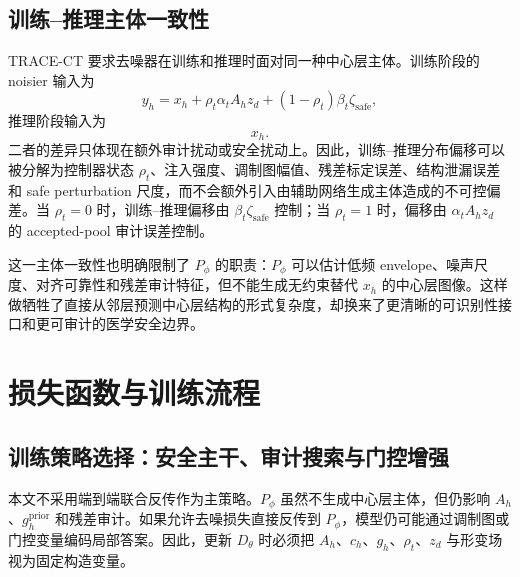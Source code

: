 \documentclass[11pt,a4paper,UTF8,fontset=fandol]{ctexart}
\theoremstyle{definition}
\begin{document}
\subsection{训练--推理主体一致性}

TRACE-CT 要求去噪器在训练和推理时面对同一种中心层主体。训练阶段的 noisier 输入为
\begin{equation}
    y_h=x_h+\rho_t\alpha_tA_hz_d+(1-\rho_t)\beta_t\zeta_{\mathrm{safe}},
\end{equation}
推理阶段输入为
\begin{equation}
    x_h.
\end{equation}
二者的差异只体现在额外审计扰动或安全扰动上。因此，训练--推理分布偏移可以被分解为控制器状态 $\rho_t$、注入强度、调制图幅值、残差标定误差、结构泄漏误差和 safe perturbation 尺度，而不会额外引入由辅助网络生成主体造成的不可控偏差。当 $\rho_t=0$ 时，训练--推理偏移由 $\beta_t\zeta_{\mathrm{safe}}$ 控制；当 $\rho_t=1$ 时，偏移由 $\alpha_tA_hz_d$ 的 accepted-pool 审计误差控制。

这一主体一致性也明确限制了 $P_\phi$ 的职责：$P_\phi$ 可以估计低频 envelope、噪声尺度、对齐可靠性和残差审计特征，但不能生成无约束替代 $x_h$ 的中心层图像。这样做牺牲了直接从邻层预测中心层结构的形式复杂度，却换来了更清晰的可识别性接口和更可审计的医学安全边界。


\section{损失函数与训练流程}


\subsection{训练策略选择：安全主干、审计搜索与门控增强}

本文不采用端到端联合反传作为主策略。$P_\phi$ 虽然不生成中心层主体，但仍影响 $A_h$、$g_h^{\mathrm{prior}}$ 和残差审计。如果允许去噪损失直接反传到 $P_\phi$，模型仍可能通过调制图或门控变量编码局部答案。因此，更新 $D_\theta$ 时必须把 $A_h$、$c_h$、$g_h$、$\rho_t$、$z_d$ 与形变场视为固定构造变量。
\end{document}
